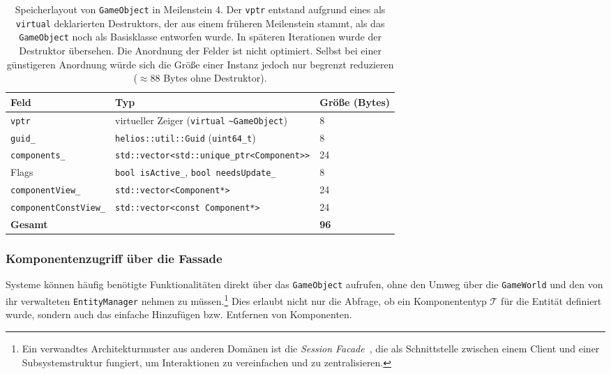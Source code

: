 \begin{table}[h]
    \centering
    \begin{tabular}{@{}lll@{}}
        \toprule
        Feld & Typ & Größe (Bytes) \\ \midrule
        \texttt{vptr} & virtueller Zeiger (\texttt{virtual} \texttt{\textasciitilde GameObject}) & 8 \\
        \texttt{guid\_} & \texttt{helios::util::Guid} (\texttt{uint64\_t}) & 8 \\
        \texttt{components\_} & \texttt{std::vector<std::unique\_ptr<Component>>} & 24 \\
        Flags & \texttt{bool isActive\_}, \texttt{bool needsUpdate\_} & 8 \\
        \texttt{componentView\_} & \texttt{std::vector<Component*>} & 24 \\
        \texttt{componentConstView\_} & \texttt{std::vector<const Component*>} & 24 \\ \midrule
        \textbf{Gesamt} & & \textbf{96} \\ \bottomrule
    \end{tabular}
    \caption{Speicherlayout von \texttt{GameObject} in Meilenstein 4.
    Der \texttt{vptr} entstand aufgrund eines als \texttt{virtual} deklarierten Destruktors, der aus einem früheren Meilenstein stammt, als das \texttt{GameObject} noch als Basisklasse entworfen wurde.
    In späteren Iterationen wurde der Destruktor übersehen.
    Die Anordnung der Felder ist nicht optimiert.
    Selbst bei einer günstigeren Anordnung würde sich die Größe einer Instanz jedoch nur begrenzt reduzieren ($\approx 88$ Bytes ohne Destruktor).}
    \label{tab:gameobject_size}
\end{table}

\subsubsection{Komponentenzugriff über die Fassade}

Systeme können häufig benötigte Funktionalitäten direkt über das \texttt{GameObject} aufrufen, ohne den Umweg über die \texttt{GameWorld} und den von ihr verwalteten \texttt{EntityManager} nehmen zu müssen.\footnote{
    Ein verwandtes Architekturmuster aus anderen Domänen ist die \textit{Session Facade}~\cite[S. 341-356]{ACM03}, die als Schnittstelle zwischen einem Client und einer Subsystemstruktur fungiert, um Interaktionen zu vereinfachen und zu zentralisieren.
}
Dies erlaubt nicht nur die Abfrage, ob ein Komponententyp $\mathcal{T}$ für die Entität definiert wurde, sondern auch das einfache Hinzufügen bzw. Entfernen von Komponenten.\\

